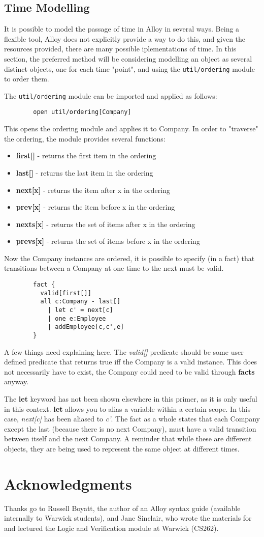 \documentclass[10pt]{article}
\begin{document}
    \subsection*{Time Modelling}
      It is possible to model the passage of time in Alloy in several ways. Being a flexible tool, Alloy does not explicitly provide a way to do this, and given the resources provided, there are many possible iplementations of time. In this section, the preferred method will be considering modelling an object as several distinct objects, one for each time "point", and using the \lstinline|util/ordering| module to order them.\par
      The \lstinline|util/ordering| module can be imported and applied as follows:
      \begin{verbatim}
        open util/ordering[Company]
      \end{verbatim}
      This opens the ordering module and applies it to Company. In order to "traverse" the ordering, the module provides several functions:
      \begin{itemize}
        \item\textbf{first[]} - returns the first item in the ordering
        \item\textbf{last[]} - returns the last item in the ordering
        \item\textbf{next[x]} - returns the item after x in the ordering
        \item\textbf{prev[x]} - returns the item before x in the ordering
        \item\textbf{nexts[x]} - returns the set of items after x in the ordering
        \item\textbf{prevs[x]} - returns the set of items before x in the ordering
      \end{itemize}\par
      Now the Company instances are ordered, it is possible to specify (in a fact) that transitions between a Company at one time to the next must be valid.
      \begin{verbatim}
        fact {
          valid[first[]]
          all c:Company - last[]
            | let c' = next[c]
            | one e:Employee
            | addEmployee[c,c',e]
        }
      \end{verbatim}
      A few things need explaining here. The \textit{valid[]} predicate should be some user defined predicate that returns true iff the Company is a valid instance. This does not necessarily have to exist, the Company could need to be valid through \textbf{facts} anyway.\par
      The \textbf{let} keyword has not been shown elsewhere in this primer, as it is only useful in this context. \textbf{let} allows you to alias a variable within a certain scope. In this case, \textit{next[c]} has been aliased to \textit{c'}. The fact as a whole states that each Company except the last (because there is no next Company), must have a valid transition between itself and the next Company. A reminder that while these are different objects, they are being used to represent the same object at different times.

  \section*{Acknowledgments}
    Thanks go to Russell Boyatt, the author of an Alloy syntax guide (available internally to Warwick students), and Jane Sinclair, who wrote the materials for and lectured the Logic and Verification module at Warwick (CS262).
\end{document}
